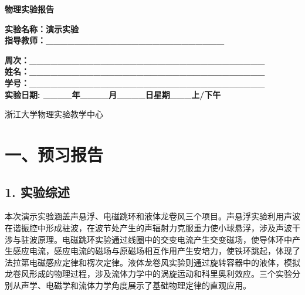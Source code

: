 \documentclass[a4paper,12pt]{article}
\begin{document}
\thispagestyle{empty}
\begin{center}
    \vspace*{2cm}
    {\fontsize{36pt}{43pt}\selectfont \textbf{物理实验报告}}
    \vspace{3cm}
\end{center}

\begin{center}
    \fontsize{16pt}{24pt}\selectfont
    \textbf{实验名称：演示实验} \\[0.5em]
    \textbf{指导教师：\_\_\_\_\_\_\_\_\_\_\_\_\_\_\_\_\_\_\_\_\_\_\_\_\_}
\end{center}

\vspace{2cm}

\begin{center}
    \fontsize{14pt}{28pt}\selectfont
    \textbf{周次：\_\_\_\_\_\_\_\_\_\_\_\_\_\_\_\_\_\_\_\_\_\_\_\_\_\_\_\_\_\_\_\_\_} \\
    \textbf{姓名：\_\_\_\_\_\_\_\_\_\_\_\_\_\_\_\_\_\_\_\_\_\_\_\_\_\_\_\_\_\_\_\_\_} \\
    \textbf{学号：\_\_\_\_\_\_\_\_\_\_\_\_\_\_\_\_\_\_\_\_\_\_\_\_\_\_\_\_\_\_\_\_\_} \\[0.5em]
    \textbf{实验日期: \_\_\_\_年\_\_\_\_月\_\_\_\_日\quad 星期\_\_\_上/下午}
\end{center}

\vspace{1.5cm}

\begin{center}
    \fontsize{14pt}{20pt}\selectfont
    浙江大学物理实验教学中心
\end{center}

\newpage

\section{一、预习报告}

\subsection{1. 实验综述}

本次演示实验涵盖声悬浮、电磁跳环和液体龙卷风三个项目。声悬浮实验利用声波在谐振腔中形成驻波，在波节处产生的声辐射力克服重力使小球悬浮，涉及声波干涉与驻波原理。电磁跳环实验通过线圈中的交变电流产生交变磁场，使导体环中产生感应电流，感应电流的磁场与原磁场相互作用产生安培力，使铁环跳起，体现了法拉第电磁感应定律和楞次定律。液体龙卷风实验则通过旋转容器中的液体，模拟龙卷风形成的物理过程，涉及流体力学中的涡旋运动和科里奥利效应。三个实验分别从声学、电磁学和流体力学角度展示了基础物理定律的直观应用。
\end{document}
